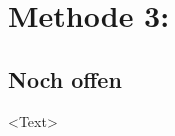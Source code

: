 \section{Methode 3: } \label{sec:risiko_monitoring}
\subsection{Noch offen}
\textless Text\textgreater
